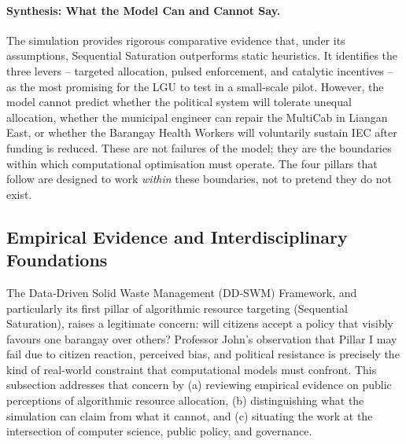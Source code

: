 \paragraph{Synthesis: What the Model Can and Cannot Say.}
The simulation provides rigorous comparative evidence that, under its assumptions, Sequential Saturation outperforms static heuristics. It identifies the three levers – targeted allocation, pulsed enforcement, and catalytic incentives – as the most promising for the LGU to test in a small‑scale pilot. However, the model cannot predict whether the political system will tolerate unequal allocation, whether the municipal engineer can repair the MultiCab in Liangan East, or whether the Barangay Health Workers will voluntarily sustain IEC after funding is reduced. These are not failures of the model; they are the boundaries within which computational optimisation must operate. The four pillars that follow are designed to work \emph{within} these boundaries, not to pretend they do not exist.

\subsection{Empirical Evidence and Interdisciplinary Foundations}
\label{subsec:empirical_foundations}

The Data‑Driven Solid Waste Management (DD‑SWM) Framework, and particularly its first pillar of algorithmic resource targeting (Sequential Saturation), raises a legitimate concern: will citizens accept a policy that visibly favours one barangay over others? Professor John’s observation that Pillar I may fail due to citizen reaction, perceived bias, and political resistance is precisely the kind of real‑world constraint that computational models must confront. This subsection addresses that concern by (a) reviewing empirical evidence on public perceptions of algorithmic resource allocation, (b) distinguishing what the simulation can claim from what it cannot, and (c) situating the work at the intersection of computer science, public policy, and governance.

